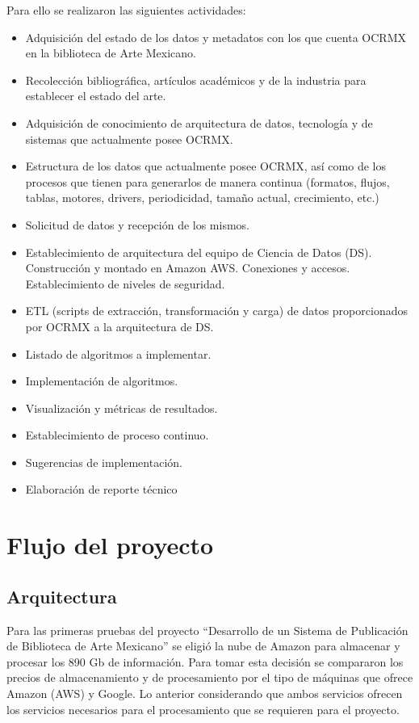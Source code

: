 Para ello se realizaron las siguientes actividades: 

\begin{itemize}

\item Adquisición del estado de los datos y metadatos con los que cuenta OCRMX en la biblioteca de Arte Mexicano.
\item	Recolección bibliográfica, artículos académicos y de la industria para establecer el estado del arte.
\item	Adquisición de conocimiento de arquitectura de datos, tecnología y de sistemas que actualmente posee OCRMX.
\item 	Estructura de los datos que actualmente posee OCRMX, así como de los procesos que tienen para generarlos de manera continua (formatos, flujos, tablas, motores, drivers, periodicidad, tamaño actual, crecimiento, etc.)
\item 	Solicitud de datos  y recepción de los mismos.
\item 	Establecimiento de arquitectura del equipo de Ciencia de Datos (DS). Construcción y montado en Amazon AWS. Conexiones y accesos. Establecimiento de niveles de seguridad.
\item 	ETL (scripts  de extracción, transformación y carga) de datos proporcionados por OCRMX a la arquitectura de DS.
\item 	Listado de algoritmos a implementar.
\item 	Implementación de algoritmos. 
\item 	Visualización y métricas de resultados.
\item 	Establecimiento de proceso continuo.
\item 	Sugerencias de implementación.
\item 	Elaboración de reporte técnico

\end{itemize}



\section{Flujo del proyecto}
\subsection{Arquitectura}
Para las primeras pruebas del  proyecto “Desarrollo de un Sistema de Publicación de Biblioteca de Arte Mexicano” se eligió la nube de Amazon para almacenar y procesar los 890 Gb de información.  Para tomar esta decisión se compararon los precios de almacenamiento y de procesamiento por el tipo de máquinas que ofrece Amazon (AWS) y Google. Lo anterior considerando que ambos servicios ofrecen los servicios necesarios para el procesamiento que se requieren para el proyecto.

